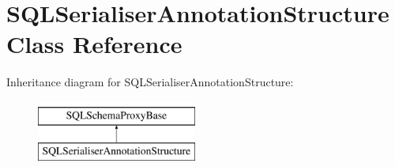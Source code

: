 \hypertarget{class_s_q_l_serialiser_annotation_structure}{}\section{S\+Q\+L\+Serialiser\+Annotation\+Structure Class Reference}
\label{class_s_q_l_serialiser_annotation_structure}
Inheritance diagram for S\+Q\+L\+Serialiser\+Annotation\+Structure\+:\begin{figure}[H]
\begin{center}
\leavevmode
\includegraphics[height=2.000000cm]{class_s_q_l_serialiser_annotation_structure}
\end{center}
\end{figure}
